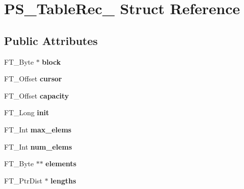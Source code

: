 \hypertarget{struct_p_s___table_rec__}{\section{P\-S\-\_\-\-Table\-Rec\-\_\- Struct Reference}
\label{struct_p_s___table_rec__}
}
\subsection*{Public Attributes}
\begin{DoxyCompactItemize}
\item 
\hypertarget{struct_p_s___table_rec___a6caa7b6aef2ba7e28d260b6a87782723}{F\-T\-\_\-\-Byte $\ast$ {\bfseries block}}\label{struct_p_s___table_rec___a6caa7b6aef2ba7e28d260b6a87782723}

\item 
\hypertarget{struct_p_s___table_rec___a8725d30f75b6dc785b988ed689ac7e58}{F\-T\-\_\-\-Offset {\bfseries cursor}}\label{struct_p_s___table_rec___a8725d30f75b6dc785b988ed689ac7e58}

\item 
\hypertarget{struct_p_s___table_rec___acf6d4f15ca247960cc7823b73d3c66bf}{F\-T\-\_\-\-Offset {\bfseries capacity}}\label{struct_p_s___table_rec___acf6d4f15ca247960cc7823b73d3c66bf}

\item 
\hypertarget{struct_p_s___table_rec___aa76fb2bcdcf4fc75e880b092bb9d3115}{F\-T\-\_\-\-Long {\bfseries init}}\label{struct_p_s___table_rec___aa76fb2bcdcf4fc75e880b092bb9d3115}

\item 
\hypertarget{struct_p_s___table_rec___a8594ec199ad792ed7ffd558806a7d23b}{F\-T\-\_\-\-Int {\bfseries max\-\_\-elems}}\label{struct_p_s___table_rec___a8594ec199ad792ed7ffd558806a7d23b}

\item 
\hypertarget{struct_p_s___table_rec___a26706016251497b19039f2c002c4e9d5}{F\-T\-\_\-\-Int {\bfseries num\-\_\-elems}}\label{struct_p_s___table_rec___a26706016251497b19039f2c002c4e9d5}

\item 
\hypertarget{struct_p_s___table_rec___a1967f81d98ea65a605968a7e1e5c51c3}{F\-T\-\_\-\-Byte $\ast$$\ast$ {\bfseries elements}}\label{struct_p_s___table_rec___a1967f81d98ea65a605968a7e1e5c51c3}

\item 
\hypertarget{struct_p_s___table_rec___a955ae6315b89923f1074f3d046da23b1}{F\-T\-\_\-\-Ptr\-Dist $\ast$ {\bfseries lengths}}\label{struct_p_s___table_rec___a955ae6315b89923f1074f3d046da23b1}


\end{DoxyCompactItemize}
